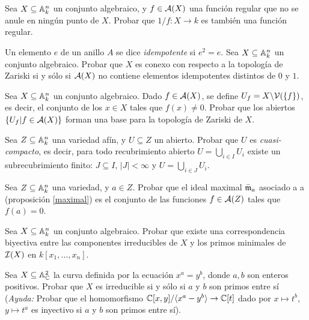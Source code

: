 \documentclass[ACGA.tex]{subfiles}
\begin{document}
\begin{ejer} Sea $X\subseteq\mathbb{A}^n_k$ un conjunto algebraico, y $f\in{\mathcal A}(X)$ una función regular que no se anule en ningún punto de $X$. Probar que $1/f:X\to k$ es también una función regular.
 \end{ejer}


\begin{ejer}
 Un elemento $e$ de un anillo $A$ se dice \emph{idempotente} si $e^2=e$. Sea $X\subseteq\mathbb{A}^n_k$ un conjunto algebraico. Probar que $X$ es conexo con respecto a la topología de Zariski si y sólo si ${\mathcal A}(X)$ no contiene elementos idempotentes distintos de $0$ y $1$.
\end{ejer}

\begin{ejer}
 Sea $X\subseteq\mathbb{A}^n_k$ un conjunto algebraico. Dado $f\in{\mathcal A}(X)$, se define $U_f=X\backslash \mathcal{V}(\{f\})$, es decir, el conjunto de los $x\in X$ tales que $f(x)\neq 0$. Probar que los abiertos $\{U_f|f\in {\mathcal A}(X)\}$ forman una base para la topología de Zariski de $X$.
\end{ejer}

\begin{ejer}\label{cuasi-compacto}
 Sea $Z\subseteq\mathbb{A}^n_k$ una variedad afín, y $U\subseteq Z$ un abierto. Probar que $U$ es \emph{cuasi-compacto}, es decir, para todo recubrimiento abierto $U=\bigcup_{i\in I}U_i$ existe un subrecubrimiento finito: $J\subseteq I$, $|J|<\infty$ y $U=\bigcup_{i\in J}U_i$. 
\end{ejer}

\begin{ejer}\label{maximal2}
 Sea $Z\subseteq\mathbb{A}^n_k$ una variedad, y $a\in Z$. Probar que el ideal maximal $\bar{{\mathfrak{m}}}_a$ asociado a a (proposición \ref{maximal}) es el conjunto de las funciones $f\in{\mathcal A}(Z)$ tales que $f(a)=0$.
\end{ejer}



\begin{ejer}
 Sea $X\subseteq\mathbb{A}^n_k$ un conjunto algebraico. Probar que existe una correspondencia biyectiva entre las componentes irreducibles de $X$ y los primos minimales de $\mathcal{I}(X)$ en $k[x_1,\ldots,x_n]$.
\end{ejer}

\begin{ejer}
 Sea $X\subseteq\mathbb{A}^2_{\mathbb{C}}$ la curva definida por la ecuación $x^a=y^b$, donde $a,b$ son enteros positivos. Probar que $X$ es irreducible si y sólo si $a$ y $b$ son primos entre sí (\emph{Ayuda: } Probar que el homomorfismo $\mathbb{C}[x,y]/\langle x^a-y^b\rangle\to\mathbb{C}[t]$ dado por $x\mapsto t^b$, $y\mapsto t^a$ es inyectivo si $a$ y $b$ son primos entre sí).
\end{ejer}
\end{document}
